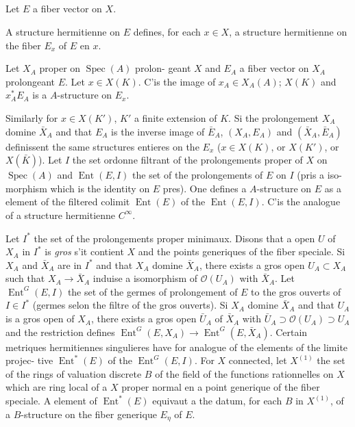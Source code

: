 \documentclass[12pt,a4paper]{article}
\theoremstyle{plain}
\theoremstyle{definition}
\DeclareMathOperator{\Spec}{Spec}
\DeclareMathOperator{\Ent}{Ent}
\newcommand{\Oo}{\mathscr{O}}
\begin{document}
\subsection{}

Let $E$ a fiber vector on $X$.

\smallskip

\begin{minipage}[t]{0.48\textwidth}
A structure hermitienne on
$E$ defines, for each $x \in X$,
a structure hermitienne on
the fiber $E_x$ of $E$ en $x$.
\end{minipage}
\hfill
\begin{minipage}[t]{0.48\textwidth}
Let $X_A$ proper on $\Spec(A)$ prolon-
geant $X$ and $E_A$ a fiber vector
on $X_A$ prolongeant $E$. Let $x \in
X(K)$. C'is the image of $x_A \in X_A(A)$;
$X(K)$ and $x_A^* E_A$ is a $A$-structure
on $E_x$.
\end{minipage}

\smallskip

Similarly for $x \in X(K')$, $K'$ a finite extension of $K$. Si the prolongement
$X_A$ domine $\bar{X}_A$ and that $E_A$ is the inverse image of $\bar{E}_A$, $(X_A, E_A)$ and $(\bar{X}_A, \bar{E}_A)$
definissent the same structures entieres on the $E_x$ ($x \in X(K)$, or $X(K')$, or
$X(\bar{K})$). Let $I$ the set ordonne filtrant of the prolongements proper of $X$ on
$\Spec(A)$ and $\Ent(E, I)$ the set of the prolongements of $E$ on $I$ (pris a iso-
morphism which is the identity on $E$ pres). One defines a $A$-structure on $E$
as a element of the filtered colimit $\Ent(E)$ of the $\Ent(E, I)$. C'is the analogue
of a structure hermitienne $C^\infty$.

Let $I^*$ the set of the prolongements proper minimaux. Disons that a open
$U$ of $X_A$ in $I^*$ is \emph{gros} s'it contient $X$ and the points generiques of the fiber
speciale. Si $X_A$ and $\bar{X}_A$ are in $I^*$ and that $X_A$ domine $\bar{X}_A$, there exists a
gros open $U_A \subset X_A$ such that $X_A \to \bar{X}_A$ induise a isomorphism of $\Oo(U_A)$ with
$\bar{X}_A$. Let $\Ent^G(E, I)$ the set of the germes of prolongement of $E$ to the gros ouverts
of $I \in I^*$ (germes selon the filtre of the gros ouverts). Si $X_A$ domine $\bar{X}_A$ and that
$U_A$ is a gros open of $X_A$, there exists a gros open $\bar{U}_A$ of $\bar{X}_A$ with $\bar{U}_A \supset
\Oo(U_A) \supset U_A$ and the restriction defines $\Ent^G(E, X_A) \to \Ent^G(E, \bar{X}_A)$. Certain
metriques hermitiennes singulieres have for analogue of the elements of the limite projec-
tive $\Ent^*(E)$ of the $\Ent^G(E, I)$. For $X$ connected, let $X^{(1)}$ the set of the rings
of valuation discrete $B$ of the field of the functions rationnelles on $X$ which are ring
local of a $X$ proper normal en a point generique of the fiber speciale. A element
of $\Ent^*(E)$ equivaut a the datum, for each $B$ in $X^{(1)}$, of a $B$-structure
on the fiber generique $E_\eta$ of $E$.
\end{document}
